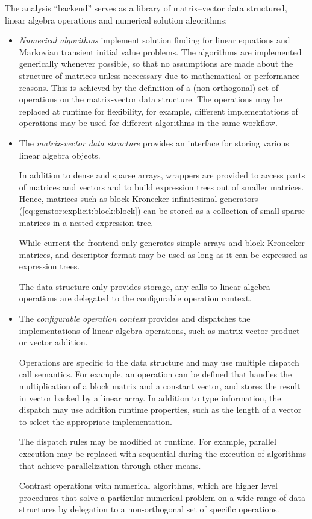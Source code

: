 The analysis ``backend'' serves as a library of matrix--vector data
structured, linear algebra operations and numerical solution
algorithms:
\begin{itemize}
\item \emph{Numerical algorithms} implement solution finding for linear
  equations and Markovian transient initial value problems. The
  algorithms are implemented generically whenever possible, so that no
  assumptions are made about the structure of matrices unless
  neccessary due to mathematical or performance reasons. This is
  achieved by the definition of a (non-orthogonal) set of operations
  on the matrix-vector data structure. The operations may be replaced
  at runtime for flexibility, for example, different implementations
  of operations may be used for different algorithms in the same
  workflow.

\item The \emph{matrix-vector data structure} provides an interface
  for storing various linear algebra objects.

  In addition to dense and sparse arrays, wrappers are provided to
  access parts of matrices and vectors and to build expression trees
  out of smaller matrices. Hence, matrices such as block Kronecker
  infinitesimal generators (\vref{eq:genstor:explicit:block:block})
  can be stored as a collection of small sparse matrices in a nested
  expression tree.

  While current the frontend only generates simple arrays and block
  Kronecker matrices, and descriptor format may be used as long as it
  can be expressed as expression trees.

  The data structure only provides storage, any calls to linear
  algebra operations are delegated to the configurable operation
  context.

\item The \emph{configurable operation context} provides and
  dispatches the implementations of linear algebra operations, such as
  matrix-vector product or vector addition.

  Operations are specific to the data structure and may use multiple
  dispatch call semantics. For example, an operation can be defined
  that handles the multiplication of a block matrix and a constant
  vector, and stores the result in vector backed by a linear
  array. In addition to type information, the dispatch may use
  addition runtime properties, such as the length of a vector to
  select the appropriate implementation.

  The dispatch rules may be modified at runtime. For example, parallel
  execution may be replaced with sequential during the execution of
  algorithms that achieve parallelization through other means.

  Contrast operations with numerical algorithms, which are higher level
  procedures that solve a particular numerical problem on a wide range
  of data structures by delegation to a non-orthogonal set of specific
  operations.
\end{itemize}

